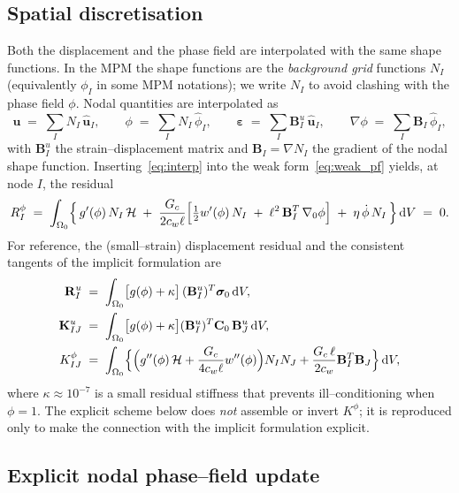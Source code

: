\documentclass[12pt,a4paper]{article}
\newcommand{\bsig}{\boldsymbol{\sigma}}
\newcommand{\beps}{\boldsymbol{\varepsilon}}
\newcommand{\bu}{\mathbf{u}}
\newcommand{\bB}{\mathbf{B}}
\newcommand{\bK}{\mathbf{K}}
\newcommand{\bR}{\mathbf{R}}
\newcommand{\Cz}{\mathbf{C}_0}
\newcommand{\dd}{\,\mathrm{d}}
\begin{document}
	\subsection{Spatial discretisation}

	Both the displacement and the phase field are interpolated with the same shape
	functions. In the MPM the shape functions are the \emph{background grid}
	functions $N_I$ (equivalently $\phi_I$ in some MPM notations); we write $N_I$ to
	avoid clashing with the phase field $\phi$. Nodal quantities are interpolated as
	\begin{equation}\label{eq:interp}
		\bu \;=\; \sum_{I} N_I\,\hat{\bu}_I,
		\qquad
		\phi \;=\; \sum_{I} N_I\,\hat{\phi}_I,
		\qquad
		\beps \;=\; \sum_{I}\bB_I^{u}\,\hat{\bu}_I,
		\qquad
		\nabla\phi \;=\; \sum_{I}\bB_I\,\hat{\phi}_I,
	\end{equation}
	with $\bB_I^{u}$ the strain--displacement matrix and $\bB_I=\nabla N_I$ the
	gradient of the nodal shape function. Inserting~\eqref{eq:interp}
	into the weak form~\eqref{eq:weak_pf} yields, at node $I$, the residual
	\begin{equation}\label{eq:res_pf}
		R_I^{\phi}
		\;=\; \int_{\Omega_0}\Bigl\{\,g'(\phi)\,N_I\,\mathcal{H}
		\;+\; \frac{G_c}{2c_w\ell}\Bigl[\tfrac{1}{2}w'(\phi)\,N_I
		\;+\; \ell^2\,\bB_I^{T}\,\nabla_0\phi\Bigr]
		\;+\; \eta\,\dot{\phi}\,N_I\,\Bigr\}\dd V \;=\; 0 .
	\end{equation}
	For reference, the (small--strain) displacement residual and the consistent
	tangents of the implicit formulation are
	\begin{align}
		\bR_I^{u} &\;=\; \int_{\Omega_0}\bigl[g(\phi)+\kappa\bigr]\,(\bB_I^{u})^{T}\bsig_0\dd V, \label{eq:res_u}\\
		\bK_{IJ}^{u} &\;=\; \int_{\Omega_0}\bigl[g(\phi)+\kappa\bigr](\bB_I^{u})^{T}\Cz\,\bB_J^{u}\dd V, \label{eq:Kuu}\\
		K_{IJ}^{\phi} &\;=\; \int_{\Omega_0}\Bigl\{\Bigl(g''(\phi)\,\mathcal{H}+\frac{G_c}{4c_w\ell}w''(\phi)\Bigr)N_I N_J + \frac{G_c\,\ell}{2c_w}\bB_I^{T}\bB_J\Bigr\}\dd V, \label{eq:Kpp}
	\end{align}
	where $\kappa\approx 10^{-7}$ is a small residual stiffness that prevents
	ill--conditioning when $\phi=1$. The explicit scheme below does \emph{not}
	assemble or invert $K^{\phi}$; it is reproduced only to make the connection with
	the implicit formulation explicit.

	\subsection{Explicit nodal phase--field update}\label{sec:explicit_update}
\end{document}
